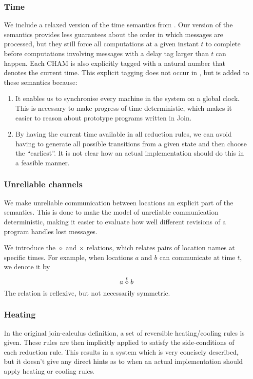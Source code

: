 \newpage

\subsubsection{Time}
We include a relaxed version of the time semantics from \cite{timed-join}. Our
version of the semantics provides less guarantees about the order in which
messages are processed, but they still force all computations at a given instant
$t$ to complete before computations involving messages with a delay tag larger
than $t$ can happen. Each CHAM is also explicitly tagged with a natural number
that denotes the current time. This explicit tagging does not occur in
\cite{timed-join}, but is added to these semantics because:
\begin{enumerate}
 \item It enables us to synchronise every machine in the system on a global
 clock. This is necessary to make progress of time deterministic, which makes
 it easier to reason about prototype programs written in Join.
 \item By having the current time available in all reduction rules, we can
 avoid having to generate all possible transitions from a given state and then
 choose the ``earliest''. It is not clear how an actual implementation should
 do this in a feasible manner.
\end{enumerate}

\subsubsection{Unreliable channels}
We make unreliable communication between locations an explicit part of the
semantics. This is done to make the model of unreliable communication
deterministic, making it easier to evaluate how well different revisions of a
program handles lost messages.

We introduce the $\diamond$ and $\times$ relations, which relates pairs of
location names at specific times. For example, when locations $a$ and $b$ can
communicate at time $t$, we denote it by
\begin{equation*}
 a \stackrel{t}{\diamond} b
\end{equation*}
The relation is reflexive, but not necessarily symmetric.

\subsubsection{Heating}
In the original join-calculus definition, a set of reversible heating/cooling
rules is given. These rules are then implicitly applied to satisfy the
side-conditions of each reduction rule. This results in a system which is very
concisely described, but it doesn't give any direct hints as to when an actual
implementation should apply heating or cooling rules.

